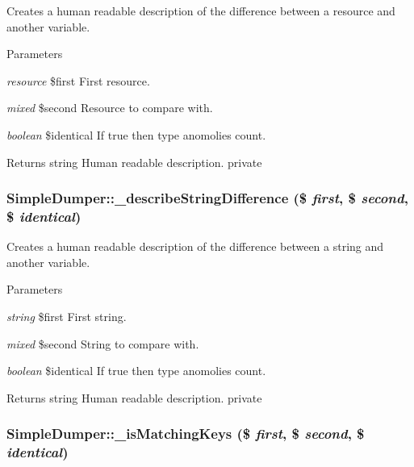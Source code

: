\label{class_simple_dumper_a5b97a3602c33af778f5e9f0711e42073}
Creates a human readable description of the difference between a resource and another variable. 
\begin{DoxyParams}{Parameters}
\item[{\em resource}]\$first First resource. \item[{\em mixed}]\$second Resource to compare with. \item[{\em boolean}]\$identical If true then type anomolies count. \end{DoxyParams}
\begin{DoxyReturn}{Returns}
string Human readable description.  private 
\end{DoxyReturn}
\hypertarget{class_simple_dumper_ae437e663ab617a81ecad026150095bb3}{
\subsubsection[{\_\-describeStringDifference}]{\setlength{\rightskip}{0pt plus 5cm}SimpleDumper::\_\-describeStringDifference (\$ {\em first}, \/  \$ {\em second}, \/  \$ {\em identical})}}
\label{class_simple_dumper_ae437e663ab617a81ecad026150095bb3}
Creates a human readable description of the difference between a string and another variable. 
\begin{DoxyParams}{Parameters}
\item[{\em string}]\$first First string. \item[{\em mixed}]\$second String to compare with. \item[{\em boolean}]\$identical If true then type anomolies count. \end{DoxyParams}
\begin{DoxyReturn}{Returns}
string Human readable description.  private 
\end{DoxyReturn}
\hypertarget{class_simple_dumper_ac0da3bfc6ffa456da3d5aa360f70aed8}{
\subsubsection[{\_\-isMatchingKeys}]{\setlength{\rightskip}{0pt plus 5cm}SimpleDumper::\_\-isMatchingKeys (\$ {\em first}, \/  \$ {\em second}, \/  \$ {\em identical})}}
